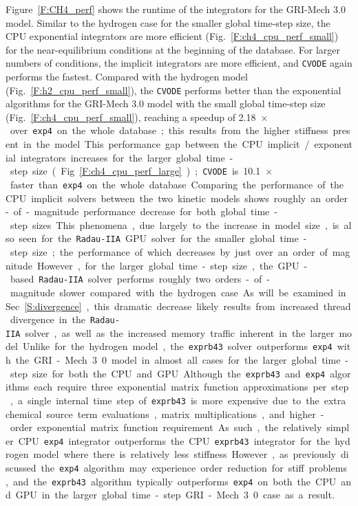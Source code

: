 \documentclass[preprint,review,11pt]{elsarticle}
\begin{document}
Figure~\ref{F:CH4_perf} shows the runtime of the integrators for the GRI-Mech 3.0 model.
Similar to the hydrogen case for the smaller global time-step size, the CPU exponential integrators are more efficient (Fig.~\ref{F:ch4_cpu_perf_small}) for the near-equilibrium conditions at the beginning of the database.
For larger numbers of conditions, the implicit integrators are more efficient, and \texttt{CVODE} again performs the fastest.
Compared with the hydrogen model (Fig.~\ref{F:h2_cpu_perf_small}), the \texttt{CVODE} performs better than the exponential algorithms for the GRI-Mech 3.0 model with the small global time-step size (Fig.~\ref{F:ch4_cpu_perf_small}), reaching a speedup of \SI{2.18}{$\times$} over \texttt{exp4} on the whole database; this results from the higher stiffness present in the model.
This performance gap between the CPU implicit\slash exponential integrators increases for the larger global time-step size (Fig.~\ref{F:ch4_cpu_perf_large}); \texttt{CVODE} is \SI{10.1}{$\times$} faster than \texttt{exp4} on the whole database.
Comparing the performance of the CPU implicit solvers between the two kinetic models shows roughly an order-of-magnitude performance decrease for both global time-step sizes.
This phenomena, due largely to the increase in model size, is also seen for the \texttt{Radau-IIA} GPU solver for the smaller global time-step size; the performance of which decreases by just over an order of magnitude.
However, for the larger global time-step size, the GPU-based \texttt{Radau-IIA} solver performs roughly two orders-of-magnitude slower compared with the hydrogen case.
As will be examined in Sec.~\ref{S:divergence}, this dramatic decrease likely results from increased thread divergence in the \texttt{Radau-IIA} solver, as well as the increased memory traffic inherent in the larger model.

Unlike for the hydrogen model, the \texttt{exprb43} solver outperforms \texttt{exp4} with the GRI-Mech 3.0 model in almost all cases for the larger global time-step size for both the CPU and GPU.
Although the \texttt{exprb43} and \texttt{exp4} algorithms each require three exponential matrix function approximations per step, a single internal time step of \texttt{exprb43} is more expensive due to the extra chemical source term evaluations, matrix multiplications, and higher-order exponential matrix function requirement.
As such, the relatively simpler CPU \texttt{exp4} integrator outperforms the CPU \texttt{exprb43} integrator for the hydrogen model where there is relatively less stiffness.
However, as previously discussed the \texttt{exp4} algorithm may experience order reduction for stiff problems, and the \texttt{exprb43} algorithm typically outperforms \texttt{exp4} on both the CPU and GPU in the larger global time-step GRI-Mech 3.0 case as a result.
\end{document}
